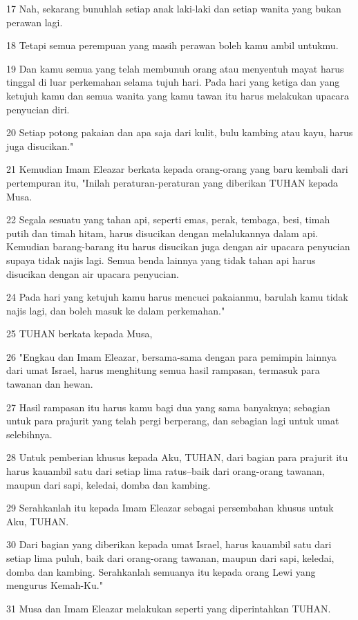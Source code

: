 \par 17 Nah, sekarang bunuhlah setiap anak laki-laki dan setiap wanita yang bukan perawan lagi.
\par 18 Tetapi semua perempuan yang masih perawan boleh kamu ambil untukmu.
\par 19 Dan kamu semua yang telah membunuh orang atau menyentuh mayat harus tinggal di luar perkemahan selama tujuh hari. Pada hari yang ketiga dan yang ketujuh kamu dan semua wanita yang kamu tawan itu harus melakukan upacara penyucian diri.
\par 20 Setiap potong pakaian dan apa saja dari kulit, bulu kambing atau kayu, harus juga disucikan."
\par 21 Kemudian Imam Eleazar berkata kepada orang-orang yang baru kembali dari pertempuran itu, "Inilah peraturan-peraturan yang diberikan TUHAN kepada Musa.
\par 22 Segala sesuatu yang tahan api, seperti emas, perak, tembaga, besi, timah putih dan timah hitam, harus disucikan dengan melalukannya dalam api. Kemudian barang-barang itu harus disucikan juga dengan air upacara penyucian supaya tidak najis lagi. Semua benda lainnya yang tidak tahan api harus disucikan dengan air upacara penyucian.
\par 24 Pada hari yang ketujuh kamu harus mencuci pakaianmu, barulah kamu tidak najis lagi, dan boleh masuk ke dalam perkemahan."
\par 25 TUHAN berkata kepada Musa,
\par 26 "Engkau dan Imam Eleazar, bersama-sama dengan para pemimpin lainnya dari umat Israel, harus menghitung semua hasil rampasan, termasuk para tawanan dan hewan.
\par 27 Hasil rampasan itu harus kamu bagi dua yang sama banyaknya; sebagian untuk para prajurit yang telah pergi berperang, dan sebagian lagi untuk umat selebihnya.
\par 28 Untuk pemberian khusus kepada Aku, TUHAN, dari bagian para prajurit itu harus kauambil satu dari setiap lima ratus--baik dari orang-orang tawanan, maupun dari sapi, keledai, domba dan kambing.
\par 29 Serahkanlah itu kepada Imam Eleazar sebagai persembahan khusus untuk Aku, TUHAN.
\par 30 Dari bagian yang diberikan kepada umat Israel, harus kauambil satu dari setiap lima puluh, baik dari orang-orang tawanan, maupun dari sapi, keledai, domba dan kambing. Serahkanlah semuanya itu kepada orang Lewi yang mengurus Kemah-Ku."
\par 31 Musa dan Imam Eleazar melakukan seperti yang diperintahkan TUHAN.
